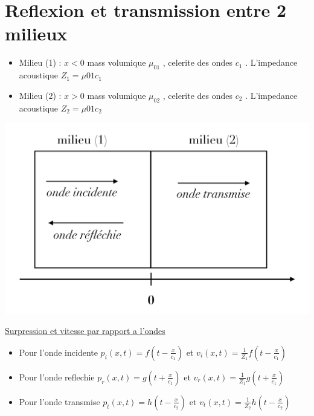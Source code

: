 \documentclass[12pt]{book}
\begin{document}
        \section{Reflexion et transmission entre 2 milieux}
            \begin{center}
                \begin{minipage}{0.49\linewidth}
                    \begin{itemize}
                        \item Milieu (1) : $ x<0 $ mass volumique $\mu_{01}$ , celerite des ondes $c_1$ . L'impedance acoustique $Z_1 = \mu{01}c_1$
                        \item Milieu (2) : $ x>0 $ mass volumique $\mu_{02}$ , celerite des ondes $c_2$ . L'impedance acoustique $Z_2 = \mu{01}c_2$
                    \end{itemize}
                \end{minipage}
                \begin{minipage}{0.49\linewidth}
                    \includegraphics[width=\linewidth]{pic/reftran2milieu.png} 
                \end{minipage}
            \end{center}     
            \underline{Surpression et vitesse par rapport a l'ondes }
            \begin{itemize}
                \item Pour l'onde incidente
                    $p_i(x,t)=f(t-\frac{x}{c_1})$ et $v_i(x,t) = \frac{1}{Z_1}f(t-\frac{x}{c_1})$
                \item Pour l'onde reflechie
                    $p_r(x,t)=g(t+\frac{x}{c_1})$ et $v_r(x,t) = \frac{1}{Z_1}g(t+\frac{x}{c_1})$
                \item Pour l'onde transmise
                    $p_t(x,t)=h(t-\frac{x}{c_2})$ et $v_t(x,t) = \frac{1}{Z_2}h(t-\frac{x}{c_2})$
            \end{itemize}
\end{document}
